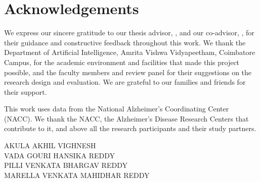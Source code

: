 \chapter*{Acknowledgements}

We express our sincere gratitude to our thesis advisor, \guide, and our co-advisor, \coguide, for their guidance and constructive feedback throughout this work. We thank the Department of Artificial Intelligence, Amrita Vishwa Vidyapeetham, Coimbatore Campus, for the academic environment and facilities that made this project possible, and the faculty members and review panel for their suggestions on the research design and evaluation. We are grateful to our families and friends for their support.

This work uses data from the National Alzheimer's Coordinating Center (NACC). We thank the NACC, the Alzheimer's Disease Research Centers that contribute to it, and above all the research participants and their study partners.

\vspace{1.5cm}
\begin{flushright}
AKULA AKHIL VIGHNESH\\
VADA GOURI HANSIKA REDDY\\
PILLI VENKATA BHARGAV REDDY\\
MARELLA VENKATA MAHIDHAR REDDY
\end{flushright}

\cleardoublepage
{}
{}
\listoffigures

\cleardoublepage
{}
{}
\listoftables


